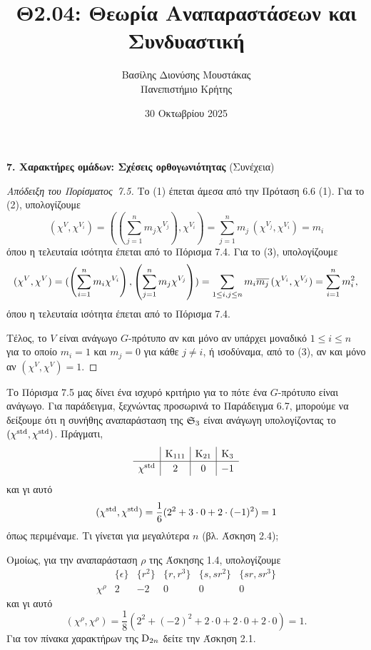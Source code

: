 \documentclass[12pt,a4paper,reqno]{amsart}
\title{Θ2.04: Θεωρία Αναπαραστάσεων και Συνδυαστική}
\author[Β.~Δ. Μουστακας]{Βασίλης Διονύσης Μουστάκας \\ Πανεπιστήμιο Κρήτης}
\date{30 Οκτωβρίου 2025}
\begin{document}
\begingroup
\def\uppercasenonmath#1{} %
\let\MakeUppercase\relax %
\maketitle
\endgroup


\setcounter{section}{7}
\setcounter{theorem}{5}
\begin{center}
    \textbf{7. Χαρακτήρες ομάδων: Σχέσεις ορθογωνιότητας
} (Συνέχεια)
\end{center}

\begin{proof}[Απόδειξη του Πορίσματος~7.5]
    Το (1) έπεται άμεσα από την Πρόταση 6.6 (1). Για το (2), υπολογίζουμε
    \[
    (\chi^V, \chi^{V_i}) = (\left(\sum_{j=1}^n m_j \chi^{V_j}\right), \chi^{V_i}) = \sum_{j=1}^n m_j \, (\chi^{V_j}, \chi^{V_i}) = m_i 
    \]
    όπου η τελευταία ισότητα έπεται από το Πόρισμα 7.4. Για το (3), υπολογίζουμε 
    \[
    (\chi^V, \chi^V) = (\left(\sum_{i=1}^n m_i \chi^{V_i}\right), \left(\sum_{j=1}^n m_j \chi^{V_j}\right)) 
    = \sum_{1 \le i, j \le n} m_i\overline{m_j} \, (\chi^{V_i}, \chi^{V_j}) 
    = \sum_{i=1}^n m_i^2,
    \]
    όπου η τελευταία ισότητα έπεται από το Πόρισμα 7.4. 
    
    Τέλος, το $V$ είναι ανάγωγο $G$-πρότυπο αν και μόνο αν υπάρχει μοναδικό $1 \le i \le n$ για το οποίο $m_i = 1$ και $m_j = 0$ για κάθε $j \neq i$, ή ισοδύναμα, από το (3), αν και μόνο αν $(\chi^V, \chi^V)=1$. 
\end{proof}

Το Πόρισμα 7.5 μας δίνει ένα ισχυρό κριτήριο για το πότε ένα $G$-πρότυπο είναι ανάγωγο. Για παράδειγμα, ξεχνώντας προσωρινά το Παράδειγμα 6.7, μπορούμε να δείξουμε ότι η συνήθης αναπαράσταση της $\mathfrak{S}_3$ είναι ανάγωγη υπολογίζοντας το $(\chi^{\mathrm{std}}, \chi^{\mathrm{std}})$. Πράγματι, 
    \[
    \renewcommand{\arraystretch}{1.2} 
    \begin{array}{c|c|c|c}
              & \rmK_{111} & \rmK_{21} & \rmK_{3} \\ \hline
    \chi^\std & 2          & 0       & -1        
    \end{array}
    \]
και γι αυτό 
    \[
    (\chi^{\mathrm{std}}, \chi^{\mathrm{std}}) = \frac{1}{6}(2^2 + 3\cdot0 + 2\cdot(-1)^2) = 1
    \]
    όπως περιμέναμε.
Τι γίνεται για μεγαλύτερα $n$ (βλ. Άσκηση 2.4);

Ομοίως, για την αναπαράσταση $\rho$ της Άσκησης 1.4, υπολογίζουμε 
    \[
    \renewcommand{\arraystretch}{1.2} 
    \begin{array}{c|c|c|c|c|c}
              & \{\epsilon\} & \{r^2\} & \{r, r^3\} & \{s, sr^2\} & \{sr, sr^3\} \\ \hline
    \chi^\rho & 2            & -2      & 0          & 0           & 0     
    \end{array}
    \]
    και γι αυτό 
    \[
    (\chi^\rho, \chi^\rho) = \frac{1}{8}(2^2 + (-2)^2 + 2\cdot0 + 2\cdot0 + 2\cdot0) = 1.
    \]
Για τον πίνακα χαρακτήρων της $\mathrm{D}_{2n}$ δείτε την Άσκηση 2.1.
\end{document}
